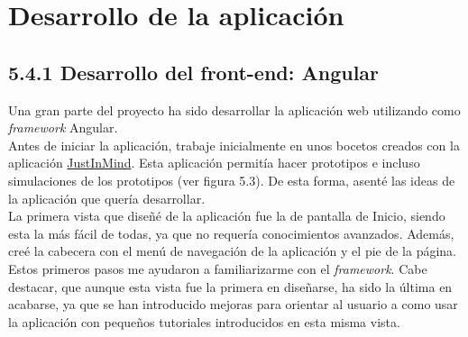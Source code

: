 \section{Desarrollo de la aplicación}
\subsection{5.4.1 Desarrollo del front-end: Angular}
Una gran parte del proyecto ha sido desarrollar la aplicación web utilizando como \textit{framework} Angular. \\
Antes de iniciar la aplicación, trabaje inicialmente en unos bocetos creados con la aplicación \href{https://www.justinmind.com/?k=just%20in%20mind&a=688685974017&adg=52001997837&cmp=1063145459&match=e&adposition=&utm_medium=cpc&utm_source=google&utm_campaign=1063145459&utm_term=just%20in%20mind_e&gad_source=1&gclid=Cj0KCQjw6auyBhDzARIsALIo6v8LqBRhq_QPIUhxUJt3DHKqPNfvJxZEdrFx4f1jqgqKfJ6g998HKFwaAm_WEALw_wcB}{JustInMind}. Esta aplicación permitía hacer prototipos e incluso simulaciones de los prototipos (ver figura 5.3). De esta forma, asenté las ideas de la aplicación que quería desarrollar. \\
La primera vista que diseñé de la aplicación fue la de pantalla de Inicio, siendo esta la más fácil de todas, ya que no requería conocimientos avanzados. Además, creé la cabecera con el menú de navegación de la aplicación y el pie de la página. Estos primeros pasos me ayudaron a familiarizarme con el \textit{framework}. Cabe destacar, que aunque esta vista fue la primera en diseñarse, ha sido la última en acabarse, ya que se han introducido mejoras para orientar al usuario a como usar la aplicación con pequeños tutoriales introducidos en esta misma vista.

